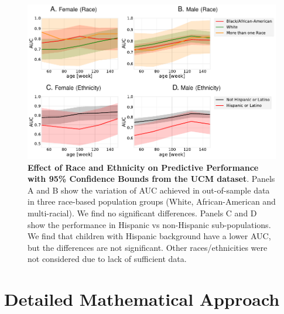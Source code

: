 \documentclass[onecolumn,,10pt]{IEEEtran}
\renewcommand{\captionN}[1]{\caption{\color{black} \sffamily \fontsize{9}{10}\selectfont #1  }}
\newif\ifFIGS
\begin{document}
{\HCOL
\ifFIGS
\begin{figure}[!ht]
  \centering
  \includegraphics[width=\textwidth]{Figures/raceeth}

  \captionN{\HCOL \textbf{Effect of Race and Ethnicity on Predictive Performance with 95\% Confidence Bounds from the UCM dataset}. Panels A and B show the variation of AUC achieved in out-of-sample data in three race-based population groups (White, African-American and multi-racial). We find no significant differences. Panels C and D show the performance in Hispanic vs non-Hispanic sub-populations. We find that children with Hispanic background have a lower AUC, but the differences are not significant. Other races/ethnicities were not considered due to lack of sufficient data. }\label{figrace}
    \vspace{-5pt}

  \end{figure}
  }

\section{Detailed Mathematical Approach}\label{sec:mathdetails}
 
\end{document}
